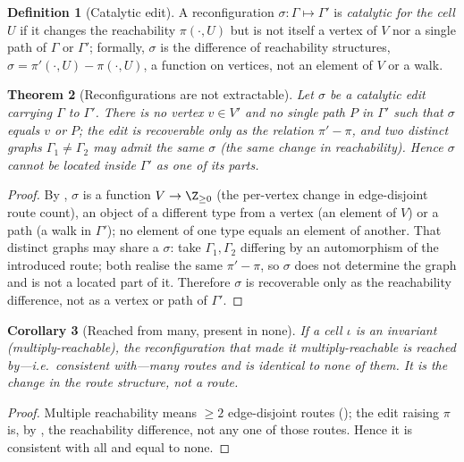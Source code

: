 \documentclass[11pt,a4paper]{article}
\theoremstyle{thmstyle}
\newtheorem{theorem}{Theorem}[section]
\newtheorem{corollary}[theorem]{Corollary}
\theoremstyle{definition}
\newtheorem{definition}[theorem]{Definition}
\theoremstyle{remark}
\newcommand{\Gph}{\Gamma}
\newcommand{\V}{V}
\newcommand{\Inv}{\iota}            %
\newcommand{\reshuffle}{\sigma}    %
\begin{document}
\begin{definition}[Catalytic edit]
\label{def:catalytic}
A reconfiguration $\reshuffle:\Gph\mapsto\Gph'$ is \emph{catalytic for the
cell $U$} if it changes the reachability $\pi(\cdot,U)$ but is not itself a
vertex of $\V$ nor a single path of $\Gph$ or $\Gph'$; formally,
$\reshuffle$ is the difference of reachability structures,
$\reshuffle=\pi'(\cdot,U)-\pi(\cdot,U)$, a function on vertices, not an
element of $\V$ or a walk.
\end{definition}

\begin{theorem}[Reconfigurations are not extractable]
\label{thm:notextract}
Let $\reshuffle$ be a catalytic edit carrying $\Gph$ to $\Gph'$. There is no
vertex $v\in\V'$ and no single path $P$ in $\Gph'$ such that $\reshuffle$
equals $v$ or $P$; the edit is recoverable only as the \emph{relation}
$\pi'-\pi$, and two distinct graphs $\Gph_1\neq\Gph_2$ may admit the same
$\reshuffle$ \textup{(}the same change in reachability\textup{)}. Hence
$\reshuffle$ cannot be located inside $\Gph'$ as one of its parts.
\end{theorem}

\begin{proof}
By , $\reshuffle$ is a function $\V\to\Z_{\ge0}$
(the per-vertex change in edge-disjoint route count), an object of a
different type from a vertex (an element of $\V$) or a path (a walk in
$\Gph'$); no element of one type equals an element of another. That distinct
graphs may share a $\reshuffle$: take $\Gph_1,\Gph_2$ differing by an
automorphism of the introduced route; both realise the same
$\pi'-\pi$, so $\reshuffle$ does not determine the graph and is not a
located part of it. Therefore $\reshuffle$ is recoverable only as the
reachability difference, not as a vertex or path of $\Gph'$.
\end{proof}

\begin{corollary}[Reached from many, present in none]
\label{cor:manynone}
If a cell $\Inv$ is an invariant (multiply-reachable), the reconfiguration
that made it multiply-reachable is reached by---i.e.\ consistent with---many
routes and is identical to none of them. It is the change in the route
structure, not a route.
\end{corollary}

\begin{proof}
Multiple reachability means $\ge2$ edge-disjoint routes
(); the edit raising $\pi$ is, by ,
the reachability difference, not any one of those routes. Hence it is
consistent with all and equal to none.
\end{proof}
\end{document}
